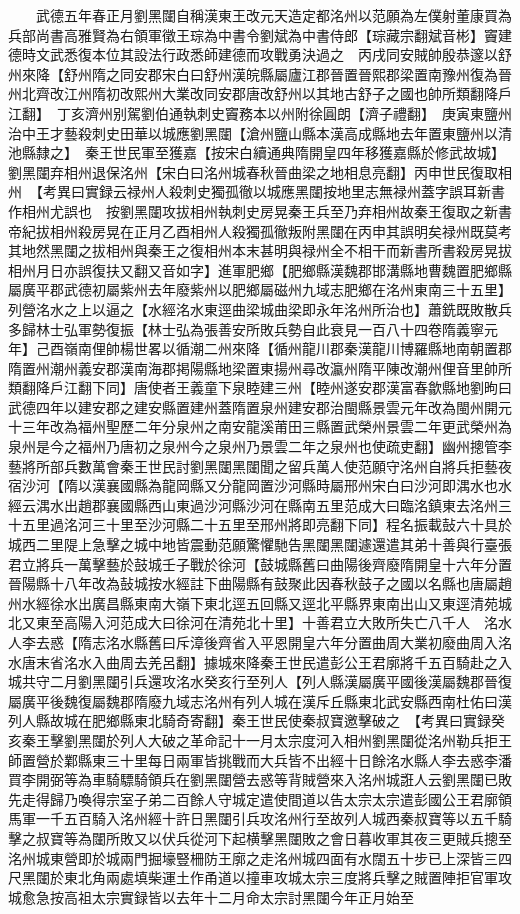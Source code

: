 　　武德五年春正月劉黑闥自稱漢東王改元天造定都洺州以范願為左僕射董康買為兵部尚書高雅賢為右領軍徵王琮為中書令劉斌為中書侍郎【琮藏宗翻斌音彬】竇建德時文武悉復本位其設法行政悉師建德而攻戰勇決過之　丙戌同安賊帥殷恭邃以舒州來降【舒州隋之同安郡宋白曰舒州漢皖縣屬廬江郡晉置晉熙郡梁置南豫州復為晉州北齊改江州隋初改熙州大業改同安郡唐改舒州以其地古舒子之國也帥所類翻降戶江翻】　丁亥濟州别駕劉伯通執刺史竇務本以州附徐圓朗【濟子禮翻】　庚寅東鹽州治中王才藝殺刺史田華以城應劉黑闥【滄州鹽山縣本漢高成縣地去年置東鹽州以清池縣隸之】　秦王世民軍至獲嘉【按宋白續通典隋開皇四年移獲嘉縣於修武故城】劉黑闥弃相州退保洺州【宋白曰洺州城春秋晉曲梁之地相息亮翻】丙申世民復取相州　【考異曰實録云禄州人殺刺史獨孤徹以城應黑闥按地里志無禄州蓋字誤耳新書作相州尤誤也　按劉黑闥攻拔相州執刺史房晃秦王兵至乃弃相州故秦王復取之新書帝紀拔相州殺房晃在正月乙酉相州人殺獨孤徹叛附黑闥在丙申其誤明矣禄州既莫考其地然黑闥之拔相州與秦王之復相州本末甚明與禄州全不相干而新書所書殺房晃拔相州月日亦誤復扶又翻又音如字】進軍肥鄉【肥鄉縣漢魏郡邯溝縣地曹魏置肥鄉縣屬廣平郡武德初屬紫州去年廢紫州以肥鄉屬磁州九域志肥鄉在洺州東南三十五里】列營洺水之上以逼之【水經洺水東逕曲梁城曲梁即永年洺州所治也】蕭銑既敗散兵多歸林士弘軍勢復振【林士弘為張善安所敗兵勢自此衰見一百八十四卷隋義寧元年】己酉嶺南俚帥楊世畧以循潮二州來降【循州龍川郡秦漢龍川博羅縣地南朝置郡隋置州潮州義安郡漢南海郡掲陽縣地梁置東揚州尋改瀛州隋平陳改潮州俚音里帥所類翻降戶江翻下同】唐使者王義童下泉睦建三州【睦州遂安郡漢富春歙縣地劉昫曰武德四年以建安郡之建安縣置建州蓋隋置泉州建安郡治閩縣景雲元年改為閩州開元十三年改為福州聖歷二年分泉州之南安龍溪莆田三縣置武榮州景雲二年更武榮州為泉州是今之福州乃唐初之泉州今之泉州乃景雲二年之泉州也使疏吏翻】幽州摠管李藝將所部兵數萬會秦王世民討劉黑闥黑闥聞之留兵萬人使范願守洺州自將兵拒藝夜宿沙河【隋以漢襄國縣為龍岡縣又分龍岡置沙河縣時屬邢州宋白曰沙河即湡水也水經云湡水出趙郡襄國縣西山東過沙河縣沙河在縣南五里范成大曰臨洺鎮東去洺州三十五里過洺河三十里至沙河縣二十五里至邢州將即亮翻下同】程名振載鼔六十具於城西二里隄上急擊之城中地皆震動范願驚懼馳告黑闥黑闥遽還遣其弟十善與行臺張君立將兵一萬擊藝於鼓城壬子戰於徐河【鼓城縣舊曰曲陽後齊廢隋開皇十六年分置晉陽縣十八年改為鼔城按水經註下曲陽縣有鼓聚此因春秋鼓子之國以名縣也唐屬趙州水經徐水出廣昌縣東南大嶺下東北逕五回縣又逕北平縣界東南出山又東逕清苑城北又東至高陽入河范成大曰徐河在清苑北十里】十善君立大敗所失亡八千人　洺水人李去惑【隋志洺水縣舊曰斥漳後齊省入平恩開皇六年分置曲周大業初廢曲周入洺水唐末省洺水入曲周去羌呂翻】據城來降秦王世民遣彭公王君廓將千五百騎赴之入城共守二月劉黑闥引兵還攻洺水癸亥行至列人【列人縣漢屬廣平國後漢屬魏郡晉復屬廣平後魏復屬魏郡隋廢九域志洺州有列人城在漢斥丘縣東北武安縣西南杜佑曰漢列人縣故城在肥鄉縣東北騎奇寄翻】秦王世民使秦叔寶邀擊破之　【考異曰實録癸亥秦王擊劉黑闥於列人大破之革命記十一月太宗度河入相州劉黑闥從洺州勒兵拒王師置營於鄴縣東三十里每日兩軍皆挑戰而大兵皆不出經十日餘洺水縣人李去惑李潘買李開弼等為車騎驃騎領兵在劉黑闥營去惑等背賊營來入洺州城誑人云劉黑闥已敗先走得歸乃喚得宗室子弟二百餘人守城定遣使間道以告太宗太宗遣彭國公王君廓領馬軍一千五百騎入洺州經十許日黑闥引兵攻洺州行至故列人城西秦叔寶等以五千騎擊之叔寶等為闥所敗又以伏兵從河下起横擊黑闥敗之會日暮收軍其夜三更賊兵摠至洺州城東營即於城兩門掘壕豎柵防王廓之走洺州城四面有水闊五十步已上深皆三四尺黑闥於東北角兩處填柴運土作甬道以撞車攻城太宗三度將兵擊之賊置陣拒官軍攻城愈急按高祖太宗實録皆以去年十二月命太宗討黑闥今年正月始至